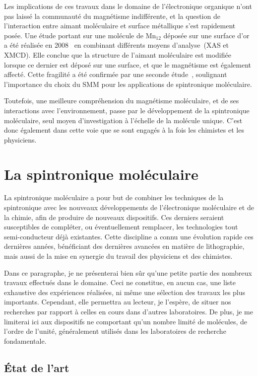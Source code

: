 Les implications de ces travaux dans le domaine de l'électronique organique n'ont pas laissé la communauté du magnétisme indifférente, et la question de l'interaction entre aimant moléculaire et surface métallique s'est rapidement posée. Une étude portant sur une molécule de Mn$_{12}$ déposée sur une surface d'or a été réalisée en 2008~\cite{Mannini2008} en combinant différents moyens d'analyse~(XAS et XMCD). Elle conclue que la structure de l'aimant moléculaire est modifiée lorsque ce dernier est déposé sur une surface, et que le magnétisme est également affecté. Cette fragilité a été confirmée par une seconde étude~\cite{Mannini2009}, soulignant l'importance du choix du SMM pour les applications de spintronique moléculaire.

Toutefois, une meilleure compréhension du magnétisme moléculaire, et de ses interactions avec l’environnement, passe par le développement de la spintronique moléculaire, seul moyen d'investigation à l'échelle de la molécule unique. C'est donc également dans cette voie que se sont engagés à la fois les chimistes et les physiciens.


\section{La spintronique moléculaire}
La spintronique moléculaire a pour but de combiner les techniques de la spintronique avec les nouveaux développements de l'électronique moléculaire et de la chimie, afin de produire de nouveaux dispositifs. Ces derniers seraient susceptibles de compléter, ou éventuellement remplacer, les technologies tout semi-conducteur déjà existantes. Cette discipline a connu une évolution rapide ces dernières années, bénéficiant des dernières avancées en matière de lithographie, mais aussi de la mise en synergie du travail des physiciens et des chimistes. 

Dans ce paragraphe, je ne présenterai bien sûr qu'une petite partie des nombreux travaux effectués dans le domaine. Ceci ne constitue, en aucun cas, une liste exhaustive des expériences réalisées, ni m\^eme une sélection des travaux les plus importants. Cependant, elle permettra au lecteur, je l'espère, de situer nos recherches par rapport à celles en cours dans d'autres laboratoires. De plus, je me limiterai ici aux dispositifs ne comportant qu'un nombre limité de molécules, de l'ordre de l'unité, généralement utilisés dans les laboratoires de recherche fondamentale.
\subsection{État de l'art}

